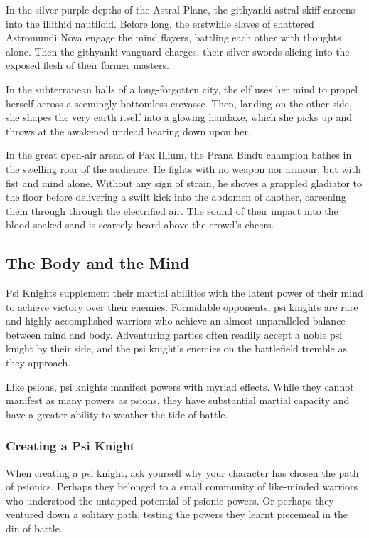 In the silver-purple depths of the Astral Plane,
the githyanki astral skiff careens into the illithid nautiloid.
Before long, the erstwhile slaves of shattered Astromundi Nova
engage the mind flayers,
battling each other with thoughts alone.
Then the githyanki vanguard charges,
their silver swords slicing into the exposed flesh of their former
masters.

In the subterranean halls of a long-forgotten city,
the elf uses her mind to propel herself across a seemingly
bottomless crevasse.
Then, landing on the other side,
she shapes the very earth itself into a glowing handaxe,
which she picks up and throws at the awakened undead
bearing down upon her.

In the great open-air arena of Pax Illium,
the Prana Bindu champion bathes in the swelling roar
of the audience.
He fights with no weapon nor armour,
but with fist and mind alone.
Without any sign of strain,
he shoves a grappled gladiator to the floor
before delivering a swift kick into the abdomen of another,
careening them through through the electrified air.
The sound of their impact into the blood-soaked sand
is scarcely heard above the crowd's cheers.

\subsection{The Body and the Mind}
Psi Knights supplement their martial abilities
with the latent power of their mind to
achieve victory over their enemies.
Formidable opponents,
psi knights are rare and highly accomplished warriors
who achieve an almost unparalleled balance between mind
and body.
Adventuring parties often readily accept a noble psi knight
by their side,
and the psi knight's enemies on the battlefield tremble
as they approach.

Like psions, psi knights manifest powers with myriad effects.
While they cannot manifest as many powers as psions,
they have substantial martial capacity
and have a greater ability to weather the tide of battle. 

\subsubsection{Creating a Psi Knight}
When creating a psi knight,
ask yourself why your character has chosen the path of psionics.
Perhaps they belonged to a small community of like-minded warriors
who understood the untapped potential of psionic powers.
Or perhaps they ventured down a solitary path,
testing the powers they learnt piecemeal in the din of battle.

